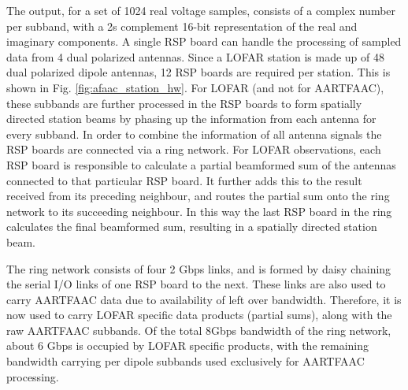 \documentclass{ws-jai}
\begin{document}
The output, for a set of 1024 real voltage samples, consists of a complex number
per  subband,  with a  2s  complement  16-bit  representation  of the  real  and
imaginary components.  A  single RSP board can handle the  processing of sampled
data from 4 dual polarized antennas. Since a LOFAR station is made up of 48 dual
polarized dipole antennas, 12 RSP boards are required per station. This is shown
in Fig.   \ref{fig:afaac_station_hw}.  For LOFAR  (and not for  AARTFAAC), these
subbands are  further processed  in the  RSP boards  to form  spatially directed
station  beams  by phasing  up  the  information  from  each antenna  for  every
subband. In  order to  combine the  information of all  antenna signals  the RSP
boards are connected via a ring  network. For LOFAR observations, each RSP board
is responsible to  calculate a partial beamformed sum of  the antennas connected
to that particular RSP board.  It further  adds this to the result received from
its preceding neighbour, and routes the partial sum onto the ring network to its
succeeding neighbour.  In this way the last RSP board in the ring calculates the
final beamformed sum, resulting in a spatially directed station beam.

The ring network consists of four 2  Gbps links, and is formed by daisy chaining
the serial I/O links of one RSP board to the next.  These links are also used to
carry AARTFAAC data  due to availability of left over  bandwidth.  Therefore, it
is now used to carry LOFAR specific data products (partial sums), along with the
raw AARTFAAC subbands.  Of the total  8Gbps bandwidth of the ring network, about
6 Gbps  is occupied  by LOFAR  specific products,  with the  remaining bandwidth
carrying per dipole subbands used exclusively for AARTFAAC processing.

\end{document}
